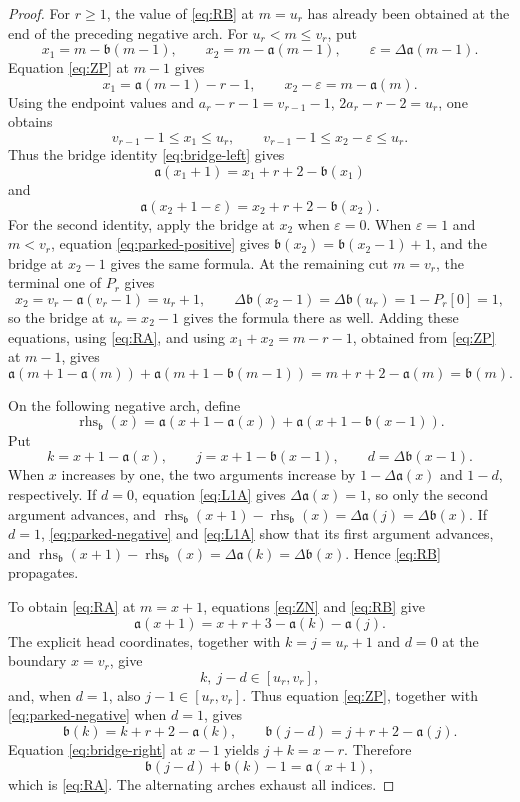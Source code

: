 \documentclass[11pt]{article}
\theoremstyle{definition}
\theoremstyle{remark}
\begin{document}
\begin{proof}
For \(r\geq1\), the value of \eqref{eq:RB} at \(m=u_r\) has already been
obtained at the end of the preceding negative arch.  For
\(u_r<m\leq v_r\), put
\[
 x_1=m-\mathfrak b(m-1),
 \qquad x_2=m-\mathfrak a(m-1),
 \qquad \varepsilon=\Delta \mathfrak a(m-1).
\]
Equation \eqref{eq:ZP} at \(m-1\) gives
\[
 x_1=\mathfrak a(m-1)-r-1,
 \qquad
 x_2-\varepsilon=m-\mathfrak a(m).
\]
Using the endpoint values and
\(a_r-r-1=v_{r-1}-1\), \(2a_r-r-2=u_r\), one obtains
\[
 v_{r-1}-1\leq x_1\leq u_r,
 \qquad
 v_{r-1}-1\leq x_2-\varepsilon\leq u_r.
\]
Thus the bridge identity \eqref{eq:bridge-left} gives
\[
 \mathfrak a(x_1+1)=x_1+r+2-\mathfrak b(x_1)
\]
and
\[
 \mathfrak a(x_2+1-\varepsilon)=x_2+r+2-\mathfrak b(x_2).
\]
For the second identity, apply the bridge at \(x_2\) when \(\varepsilon=0\).
When \(\varepsilon=1\) and \(m<v_r\), equation
\eqref{eq:parked-positive} gives
\(\mathfrak b(x_2)=\mathfrak b(x_2-1)+1\), and the bridge at \(x_2-1\)
gives the same formula.  At the remaining cut \(m=v_r\), the terminal one of
\(P_r\) gives
\[
 x_2=v_r-\mathfrak a(v_r-1)=u_r+1,
 \qquad
 \Delta\mathfrak b(x_2-1)=\Delta\mathfrak b(u_r)=1-P_r[0]=1,
\]
so the bridge at \(u_r=x_2-1\) gives the formula there as well.  Adding these
equations, using \eqref{eq:RA}, and using
\(x_1+x_2=m-r-1\), obtained from \eqref{eq:ZP} at \(m-1\), gives
\[
 \mathfrak a(m+1-\mathfrak a(m))+\mathfrak a(m+1-\mathfrak b(m-1))=m+r+2-\mathfrak a(m)=\mathfrak b(m).
\]

On the following negative arch, define
\[
 \operatorname{rhs}_{\mathfrak b}(x)
 =\mathfrak a(x+1-\mathfrak a(x))+\mathfrak a(x+1-\mathfrak b(x-1)).
\]
Put
\[
 k=x+1-\mathfrak a(x),
 \qquad
 j=x+1-\mathfrak b(x-1),
 \qquad
 d=\Delta\mathfrak b(x-1).
\]
When \(x\) increases by one, the two arguments increase by
\(1-\Delta\mathfrak a(x)\) and \(1-d\), respectively.  If \(d=0\),
equation \eqref{eq:L1A} gives \(\Delta\mathfrak a(x)=1\), so only the second
argument advances, and
\(\operatorname{rhs}_{\mathfrak b}(x+1)-\operatorname{rhs}_{\mathfrak b}(x)
=\Delta \mathfrak a(j)=\Delta \mathfrak b(x)\).  If \(d=1\),
\eqref{eq:parked-negative} and \eqref{eq:L1A} show that its first argument
advances, and
\(\operatorname{rhs}_{\mathfrak b}(x+1)-\operatorname{rhs}_{\mathfrak b}(x)
=\Delta \mathfrak a(k)=\Delta \mathfrak b(x)\).  Hence \eqref{eq:RB}
propagates.

To obtain \eqref{eq:RA} at \(m=x+1\), equations
\eqref{eq:ZN} and \eqref{eq:RB} give
\[
 \mathfrak a(x+1)=x+r+3-\mathfrak a(k)-\mathfrak a(j).
\]
The explicit head coordinates, together with
\(k=j=u_r+1\) and \(d=0\) at the boundary \(x=v_r\), give
\[
 k,\ j-d\in[u_r,v_r],
\]
and, when \(d=1\), also \(j-1\in[u_r,v_r]\).  Thus equation \eqref{eq:ZP},
together with \eqref{eq:parked-negative} when \(d=1\), gives
\[
 \mathfrak b(k)=k+r+2-\mathfrak a(k),
 \qquad \mathfrak b(j-d)=j+r+2-\mathfrak a(j).
\]
Equation \eqref{eq:bridge-right} at \(x-1\) yields \(j+k=x-r\).  Therefore
\[
 \mathfrak b(j-d)+\mathfrak b(k)-1=\mathfrak a(x+1),
\]
which is \eqref{eq:RA}.  The alternating arches exhaust all indices.
\end{proof}
\end{document}
